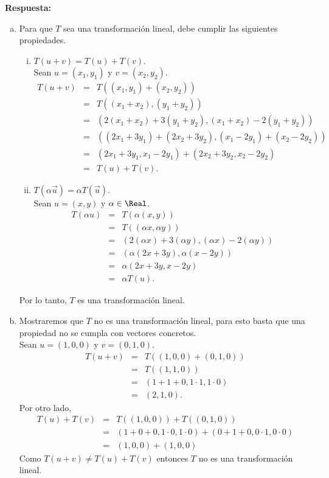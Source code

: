 \documentclass{article}
\begin{document}
\vspace{5mm}
\noindent\textbf{Respuesta:}
\begin{enumerate}[a)]
  \item Para que $T$ sea una transformación lineal, debe cumplir las siguientes propiedades.
    \begin{enumerate}[i)]
      \item $T(u+v)=T(u)+T(v)$.\\[2mm]
        Sean $u=(x_1,y_1)$ y $v=(x_2,y_2)$.
        \begin{eqnarray*}
          T(u+v)
            &=& T((x_1,y_1)+(x_2,y_2)) \\
            &=& T((x_1+x_2),(y_1+y_2)) \\
            &=& (2(x_1+x_2)+3(y_1+y_2),(x_1+x_2)-2(y_1+y_2)) \\
            &=& ((2x_1+3y_1)+(2x_2+3y_2),(x_1-2y_1)+(x_2-2y_2)) \\
            &=& (2x_1+3y_1,x_1-2y_1)+(2x_2+3y_2,x_2-2y_2) \\
            &=& T(u)+T(v).
        \end{eqnarray*}
      \item $T(\alpha\vec{u})=\alpha T(\vec{u})$.\\[2mm]
        Sean $u=(x,y)$ y $\alpha\in\Real$.
        \begin{eqnarray*}
          T(\alpha u)
            &=& T(\alpha(x,y)) \\
            &=& T((\alpha x,\alpha y)) \\
            &=& (2(\alpha x)+3(\alpha y),(\alpha x)-2(\alpha y)) \\
            &=& (\alpha(2x+3y),\alpha(x-2y)) \\
            &=& \alpha(2x+3y,x-2y) \\
            &=& \alpha T(u).
        \end{eqnarray*}
    \end{enumerate}
    Por lo tanto, $T$ es una transformación lineal.
  \newpage
  \item Mostraremos que $T$ no es una transformación lineal, para esto basta que una propiedad no se cumpla con vectores concretos.\\[2mm]
    Sean $u=(1,0,0)$ y $v=(0,1,0)$.
    \begin{eqnarray*}
      T(u+v)
        &=& T((1,0,0)+(0,1,0)) \\
        &=& T((1,1,0)) \\
        &=& (1+1+0,1\cdot 1,1\cdot 0) \\
        &=& (2,1,0).
    \end{eqnarray*}
    Por otro lado,
    \begin{eqnarray*}
      T(u)+T(v)
        &=& T((1,0,0))+T((0,1,0)) \\
        &=& (1+0+0,1\cdot 0,1\cdot 0)+(0+1+0,0\cdot 1,0\cdot 0) \\
        &=& (1,0,0)+(1,0,0) 
    \end{eqnarray*}
    Como $T(u+v)\neq T(u)+T(v)$ entonces $T$ no es una transformación lineal.
\end{enumerate}
\end{document}
